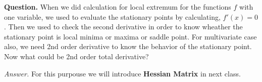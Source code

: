 \documentclass[../Analysis-3]{subfiles}
\begin{document}
\textbf{Question.} When we did calculation for local extremum for the functions $f$ with one variable, we used to evaluate the stationary points by calculating, $f'(x) =0$. Then we used to check the second derivative in order to know wheather the stationary point is local minima or maxima or saddle point. For multivariate case also, we need 2nd order derivative to know the behavior of the stationary point. Now what could be 2nd order total derivative? 

\vspace*{0.2cm}

\textit{Answer.} For this purpouse we will introduce \textbf{Hessian Matrix} in next class.
\end{document}
